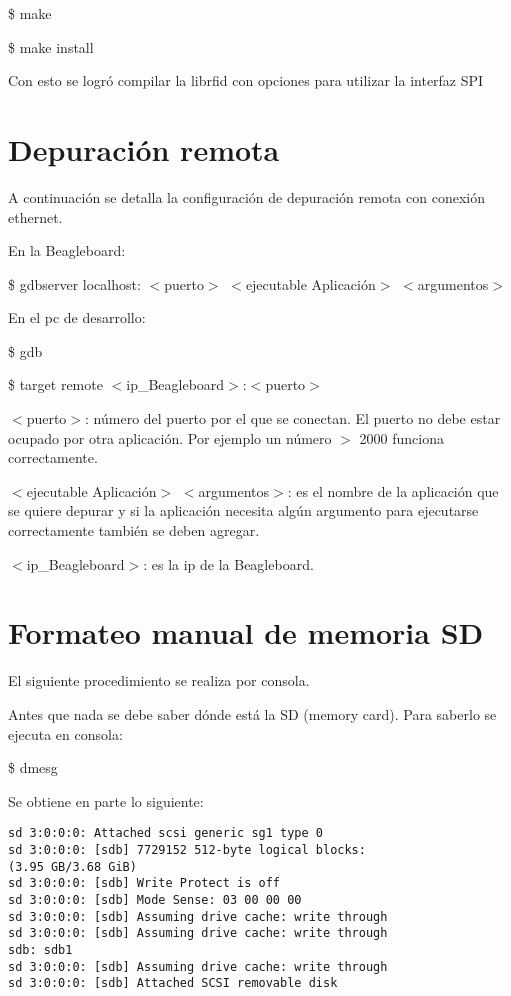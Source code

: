 \centerline{\$ make}

\centerline{\$ make install}

\bigskip
Con esto se logró compilar la librfid con opciones para utilizar la interfaz SPI


\section{Depuración remota}

A continuación se detalla la configuración de depuración remota con conexión ethernet.

\bigskip
En la Beagleboard:    

\bigskip                							
\centerline{\$ gdbserver localhost: $<$puerto$>$ $<$ejecutable Aplicación$>$ $<$argumentos$>$}

\bigskip
En el pc de desarrollo:

\bigskip
\centerline{\$ gdb}

\centerline{\$ target remote $<$ip\_Beagleboard$>$:$<$puerto$>$}

\bigskip
$<$puerto$>$: número del puerto por el que se conectan. El puerto no debe estar ocupado por otra aplicación. Por ejemplo un número $>$ 2000 funciona correctamente.

\bigskip
$<$ejecutable Aplicación$>$ $<$argumentos$>$: es el nombre de la aplicación que se quiere depurar y si la aplicación necesita algún argumento para ejecutarse correctamente también se deben agregar.

\bigskip
$<$ip\_Beagleboard$>$: es la ip de la Beagleboard.


\section{Formateo manual de memoria SD}
El siguiente procedimiento se realiza por consola.

\bigskip
Antes que nada se debe saber dónde está la SD (memory card).
Para saberlo se ejecuta en consola: 

\centerline{\$ dmesg}

\bigskip
Se obtiene en parte lo siguiente: 
\begin{verbatim}
sd 3:0:0:0: Attached scsi generic sg1 type 0 
sd 3:0:0:0: [sdb] 7729152 512-byte logical blocks: 
(3.95 GB/3.68 GiB) 
sd 3:0:0:0: [sdb] Write Protect is off 
sd 3:0:0:0: [sdb] Mode Sense: 03 00 00 00 
sd 3:0:0:0: [sdb] Assuming drive cache: write through 
sd 3:0:0:0: [sdb] Assuming drive cache: write through 
sdb: sdb1 
sd 3:0:0:0: [sdb] Assuming drive cache: write through 
sd 3:0:0:0: [sdb] Attached SCSI removable disk 
\end{verbatim}

